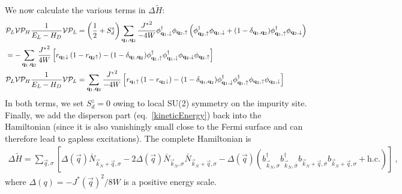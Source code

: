 \documentclass[reprint,hidelinks,onecolumn]{revtex4-2}
\begin{document}
We now calculate the various terms in \(\Delta \tilde H\):
\begin{equation}\begin{aligned}\label{kondoPert}
	&\mathcal{P}_L \mathcal{V} \mathcal{P}_H\frac{1}{E_L - H_D} \mathcal{V} \mathcal{P}_L = \left(\frac{1}{2} + S_d^z\right) \sum_{{\bf q}_1,{\bf q}_2}\frac{{J^*}^2}{-4W}\phi^\dagger_{{\bf q}_1,\downarrow}\phi_{{\bf q}_2, \uparrow} \left(\phi^\dagger_{{\bf q}_2,\uparrow}\phi_{{\bf q}_1, \downarrow} + (1 - \delta_{{\bf q}_1,{\bf q}_2})\phi^\dagger_{{\bf q}_1,\uparrow}\phi_{{\bf q}_2, \downarrow}\right)\\
	&= -\sum_{{\bf q}_1,{\bf q}_2}\frac{{J^*}^2}{4W}\left[r_{{\bf q}_1 \downarrow} \left(1 - r_{{\bf q}_2 \uparrow}\right) - (1 - \delta_{{\bf q}_1,{\bf q}_2})\phi^\dagger_{{\bf q}_1,\uparrow}\phi^\dagger_{{\bf q}_1,\downarrow}\phi_{{\bf q}_2, \downarrow}\phi_{{\bf q}_2, \uparrow}\right]\\
	&\mathcal{P}_L \mathcal{V} \mathcal{P}_H\frac{1}{E_L - H_D} \mathcal{V} \mathcal{P}_L = \sum_{{\bf q}_1,{\bf q}_2}\frac{{J^*}^2}{-4W}\left[r_{{\bf q}_1 \uparrow} \left(1 - r_{{\bf q}_2 \downarrow}\right) - (1 - \delta_{{\bf q}_1,{\bf q}_2})\phi^\dagger_{{\bf q}_1,\downarrow}\phi^\dagger_{{\bf q}_1,\uparrow}\phi_{{\bf q}_2, \uparrow}\phi_{{\bf q}_2, \downarrow}\right] \\
\end{aligned}\end{equation}
In both terms, we set \(S_d^z = 0\) owing to local SU(2) symmetry on the impurity site. Finally, we add the disperson part (eq.~\ref{kineticEnergy}) back into the Hamiltonian (since it is also vanishingly small close to the Fermi surface and can therefore lead to gapless excitations). The complete Hamiltonian is
\begin{equation}\begin{aligned}
	\Delta \tilde H = \sum_{\vec q,\sigma}\left[\Delta(\vec q)\bar N_{\vec k_N + \vec q, \sigma} -2\Delta(\vec q)\bar N_{\vec k_N, \sigma}\bar N_{\vec k_N + \vec q, \sigma} -\Delta(\vec q) \left(b^\dagger_{\vec k_N, \sigma} b^\dagger_{\vec k_N, \bar\sigma} b_{\vec k_N + \vec q, \bar\sigma}b_{\vec k_N + \vec q, \sigma} + \text{h.c.}\right) \right]~,
\end{aligned}\end{equation}
where \(\Delta(q) = -{J^*(\vec q)}^2/8W\) is a positive energy scale.
\end{document}
